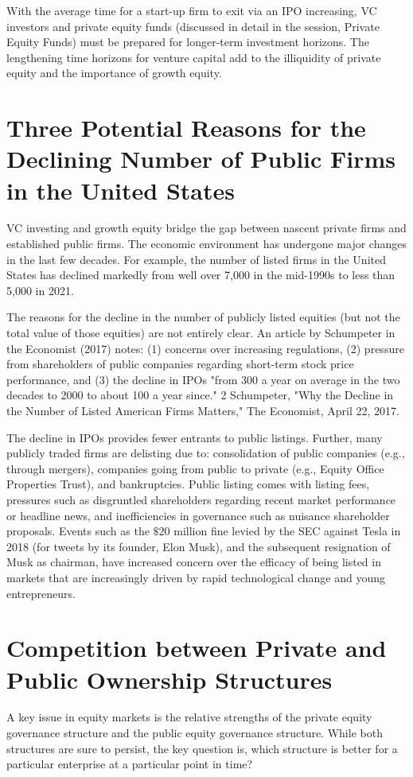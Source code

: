 \documentclass[11pt]{article}
\begin{document}
With the average time for a start-up firm to exit via an IPO increasing, VC investors and private equity funds (discussed in detail in the session, Private Equity Funds) must be prepared for longer-term investment horizons. The lengthening time horizons for venture capital add to the illiquidity of private equity and the importance of growth equity.

\section*{Three Potential Reasons for the Declining Number of Public Firms in the United States}
VC investing and growth equity bridge the gap between nascent private firms and established public firms. The economic environment has undergone major changes in the last few decades. For example, the number of listed firms in the United States has declined markedly from well over 7,000 in the mid-1990s to less than 5,000 in 2021.

The reasons for the decline in the number of publicly listed equities (but not the total value of those equities) are not entirely clear. An article by Schumpeter in the Economist (2017) notes: (1) concerns over increasing regulations, (2) pressure from shareholders of public companies regarding short-term stock price performance, and (3) the decline in IPOs "from 300 a year on average in the two decades to 2000 to about 100 a year since." 2 Schumpeter, "Why the Decline in the Number of Listed American Firms Matters," The Economist, April 22, 2017.

The decline in IPOs provides fewer entrants to public listings. Further, many publicly traded firms are delisting due to: consolidation of public companies (e.g., through mergers), companies going from public to private (e.g., Equity Office Properties Trust), and bankruptcies. Public listing comes with listing fees, pressures such as disgruntled shareholders regarding recent market performance or headline news, and inefficiencies in governance such as nuisance shareholder proposals. Events such as the $\$ 20$ million fine levied by the SEC against Tesla in 2018 (for tweets by its founder, Elon Musk), and the subsequent resignation of Musk as chairman, have increased concern over the efficacy of being listed in markets that are increasingly driven by rapid technological change and young entrepreneurs.

\section*{Competition between Private and Public Ownership Structures}
A key issue in equity markets is the relative strengths of the private equity governance structure and the public equity governance structure. While both structures are sure to persist, the key question is, which structure is better for a particular enterprise at a particular point in time?
\end{document}

